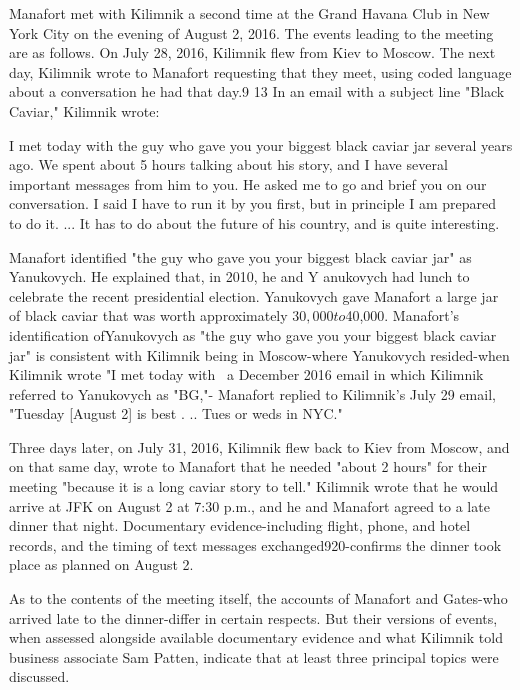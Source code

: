 Manafort met with Kilimnik a second time at the Grand Havana Club in New York City on the evening of August 2, 2016. The events leading to the meeting are as follows. On July 28, 2016, Kilimnik flew from Kiev to Moscow.%
The next day, Kilimnik wrote to Manafort requesting that they meet, using coded language about a conversation he had that day.9 13 In an email with a subject line "Black Caviar," Kilimnik wrote:

I met today with the guy who gave you your biggest black caviar jar several years ago. We spent about 5 hours talking about his story, and I have several important messages from him to you. He asked me to go and brief you on our conversation. I said I have to run it by you first, but in principle I am prepared to do it. ... It has to do about the future of his country, and is quite interesting.%

Manafort identified "the guy who gave you your biggest black caviar jar" as Yanukovych. He explained that, in 2010, he and Y anukovych had lunch to celebrate the recent presidential election. Yanukovych gave Manafort a large jar of black caviar that was worth approximately $30,000 to $40,000.%
Manafort's identification ofYanukovych as "the guy who gave you your biggest black caviar jar" is consistent with Kilimnik being in Moscow-where Yanukovych resided-when Kilimnik wrote "I met today with~ a December 2016 email in which Kilimnik referred to Yanukovych as "BG,"-%
Manafort replied to Kilimnik's July 29 email, "Tuesday [August 2] is best . .. Tues or weds in NYC."%

Three days later, on July 31, 2016, Kilimnik flew back to Kiev from Moscow, and on that same day, wrote to Manafort that he needed "about 2 hours" for their meeting "because it is a long caviar story to tell."%
Kilimnik wrote that he would arrive at JFK on August 2 at 7:30 p.m., and he and Manafort agreed to a late dinner that night.%
Documentary evidence-including flight, phone, and hotel records, and the timing of text messages exchanged920-confirms the dinner took place as planned on August 2.%

As to the contents of the meeting itself, the accounts of Manafort and Gates-who arrived late to the dinner-differ in certain respects. But their versions of events, when assessed alongside available documentary evidence and what Kilimnik told business associate Sam Patten, indicate that at least three principal topics were discussed.

